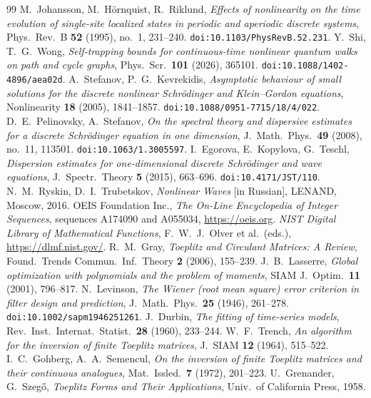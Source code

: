 \documentclass[11pt,reqno]{amsart}
\theoremstyle{plain}
\theoremstyle{definition}
\begin{document}
\begin{thebibliography}{99}
 M.~Johansson, M.~H\"ornquist, R.~Riklund, \emph{Effects of nonlinearity on the time evolution of single-site localized states in periodic and aperiodic discrete systems}, Phys.\ Rev.\ B \textbf{52} (1995), no.~1, 231--240. \texttt{doi:10.1103/PhysRevB.52.231}.
 Y.~Shi, T.~G.~Wong, \emph{Self-trapping bounds for continuous-time nonlinear quantum walks on path and cycle graphs}, Phys.\ Scr.\ \textbf{101} (2026), 365101. \texttt{doi:10.1088/1402-4896/aea02d}.
 A.~Stefanov, P.~G.~Kevrekidis, \emph{Asymptotic behaviour of small solutions for the discrete nonlinear Schr\"odinger and Klein--Gordon equations}, Nonlinearity \textbf{18} (2005), 1841--1857. \texttt{doi:10.1088/0951-7715/18/4/022}.
 D.~E.~Pelinovsky, A.~Stefanov, \emph{On the spectral theory and dispersive estimates for a discrete Schr\"odinger equation in one dimension}, J.\ Math.\ Phys.\ \textbf{49} (2008), no.~11, 113501. \texttt{doi:10.1063/1.3005597}.
 I.~Egorova, E.~Kopylova, G.~Teschl, \emph{Dispersion estimates for one-dimensional discrete Schr\"odinger and wave equations}, J.\ Spectr.\ Theory \textbf{5} (2015), 663--696. \texttt{doi:10.4171/JST/110}.
 N.~M.~Ryskin, D.~I.~Trubetskov, \emph{Nonlinear Waves} [in Russian], LENAND, Moscow, 2016.
 OEIS Foundation Inc., \emph{The On-Line Encyclopedia of Integer Sequences}, sequences A174090 and A055034, \url{https://oeis.org}.
 \emph{NIST Digital Library of Mathematical Functions}, F.~W.~J.~Olver et al.\ (eds.), \url{https://dlmf.nist.gov/}.
 R.~M.~Gray, \emph{Toeplitz and Circulant Matrices: A Review}, Found.\ Trends Commun.\ Inf.\ Theory \textbf{2} (2006), 155--239.
 J.~B.~Lasserre, \emph{Global optimization with polynomials and the problem of moments}, SIAM J.\ Optim.\ \textbf{11} (2001), 796--817.
 N.~Levinson, \emph{The Wiener (root mean square) error criterion in filter design and prediction}, J.\ Math.\ Phys.\ \textbf{25} (1946), 261--278. \texttt{doi:10.1002/sapm1946251261}.
 J.~Durbin, \emph{The fitting of time-series models}, Rev.\ Inst.\ Internat.\ Statist.\ \textbf{28} (1960), 233--244.
 W.~F.~Trench, \emph{An algorithm for the inversion of finite Toeplitz matrices}, J.\ SIAM \textbf{12} (1964), 515--522.
 I.~C.~Gohberg, A.~A.~Semencul, \emph{On the inversion of finite Toeplitz matrices and their continuous analogues}, Mat.\ Issled.\ \textbf{7} (1972), 201--223.
 U.~Grenander, G.~Szeg\H{o}, \emph{Toeplitz Forms and Their Applications}, Univ.\ of California Press, 1958.

\end{thebibliography}
\end{document}
